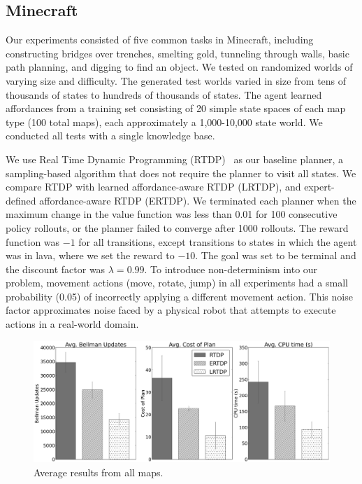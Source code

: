 \documentclass[letterpaper]{article}
\begin{document}
\subsection{Minecraft}

Our experiments consisted of five common tasks in Minecraft, including
constructing bridges over trenches, smelting gold, tunneling through
walls, basic path planning, and digging to find an object.  We tested
on randomized worlds of varying size and difficulty. The generated
test worlds varied in size from tens of thousands of states to
hundreds of thousands of states.  The agent learned affordances from a
training set consisting of 20 simple state spaces of each map type
(100 total maps), each approximately a 1,000-10,000 state world. We
conducted all tests with a single knowledge base.

We use Real Time Dynamic Programming (RTDP)~\cite{barto95} as our
baseline planner, a sampling-based algorithm that does not require the
planner to visit all states. We compare RTDP with learned
affordance-aware RTDP (LRTDP), and expert-defined affordance-aware
RTDP (ERTDP). We terminated each planner when the maximum change in
the value function was less than 0.01 for 100 consecutive policy
rollouts, or the planner failed to converge after 1000 rollouts.  The
reward function was $-1$ for all transitions, except transitions to
states in which the agent was in lava, where we set the reward to
$-10$. The goal was set to be terminal and the discount factor was
$\lambda = 0.99$.  To introduce non-determinism into our problem,
movement actions (move, rotate, jump) in all experiments had a small
probability (0.05) of incorrectly applying a different movement
action.  This noise factor approximates noise faced by a physical
robot that attempts to execute actions in a real-world domain.

\begin{figure}[t]
\centering
\includegraphics[width=1\linewidth]{figures/average_results_cropped.png}%
\caption{Average results from all maps.}
\label{fig:average_results}
\end{figure}
\end{document}
